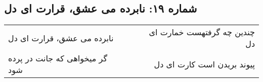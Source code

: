 \begin{center}
\section*{شماره ۱۹: نابرده می عشق، قرارت ای دل}
\label{sec:019}
\begin{longtable}{l p{0.5cm} r}
نابرده می عشق، قرارت ای دل
&&
چندین چه گرفتهست خمارت ای دل
\\
گر میخواهی که جانت در پرده شود
&&
پیوند بریدن است کارت ای دل
\\
\end{longtable}
\end{center}
